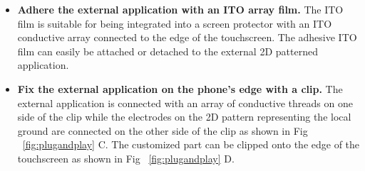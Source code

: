 \begin{itemize}
    \item \textbf{Adhere the external application with an ITO array film.} The ITO film is suitable for being integrated into a screen protector with an ITO conductive array connected to the edge of the touchscreen. The adhesive ITO film can easily be attached or detached to the external 2D patterned application. 
    \item \textbf{Fix the external application on the phone's edge with a clip.} The external application is connected with an array of conductive threads on one side of the clip while the electrodes on the 2D pattern representing the local ground are connected on the other side of the clip as shown in Fig ~\ref{fig:plugandplay} C. The customized part can be clipped onto the edge of the touchscreen as shown in Fig ~\ref{fig:plugandplay} D. 
\end{itemize}


